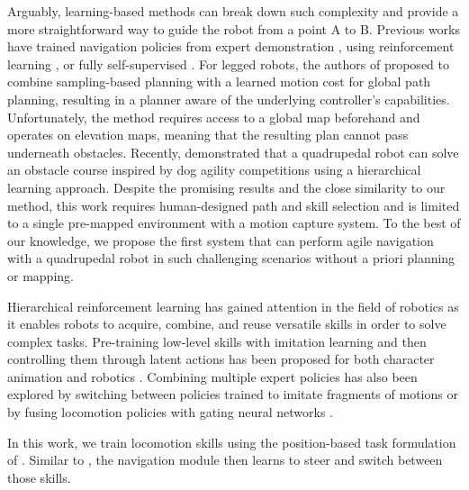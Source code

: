 \documentclass[conference]{IEEEtran}
\begin{document}
Arguably, learning-based methods can break down such complexity and provide a more straightforward way to guide the robot from a point A to B. Previous works have trained navigation policies from expert demonstration \cite{pfeiffer2017perception, Kaufmann2018DeepDR}, using reinforcement learning \cite{SadeghiL17, Sadeghi19, hoeller2021DeepNav}, or fully self-supervised \cite{Badgr}. 
For legged robots, the authors of \cite{bowen2021Navigation} proposed to combine sampling-based planning with a learned motion cost for global path planning, resulting in a planner aware of the underlying controller's capabilities. Unfortunately, the method requires access to a global map beforehand and operates on elevation maps, meaning that the resulting plan cannot pass underneath obstacles.
Recently, \cite{caluwaerts2023barkour} demonstrated that a quadrupedal robot can solve an obstacle course inspired by dog agility competitions using a hierarchical learning approach. Despite the promising results and the close similarity to our method, this work requires human-designed path and skill selection and is limited to a single pre-mapped environment with a motion capture system.
To the best of our knowledge, we propose the first system that can perform agile navigation with a quadrupedal robot in such challenging scenarios without a priori planning or mapping.

Hierarchical reinforcement learning has gained attention in the field of robotics as it enables robots to acquire, combine, and reuse versatile skills in order to solve complex tasks. Pre-training low-level skills with imitation learning and then controlling them through latent actions has been proposed for both character animation \cite{peng2022ASE} and robotics \cite{bohez2022imitate}. Combining multiple expert policies has also been explored by switching between policies trained to imitate fragments of motions \cite{merel2018hierarchical} or by fusing locomotion policies with gating neural networks \cite{yang2020MultiExpertLoco}.

In this work, we train locomotion skills using the position-based task formulation of \cite{rudinAdvancedSkills}. Similar to \cite{merel2018hierarchical}, the navigation module then learns to steer and switch between those skills. 
\end{document}
